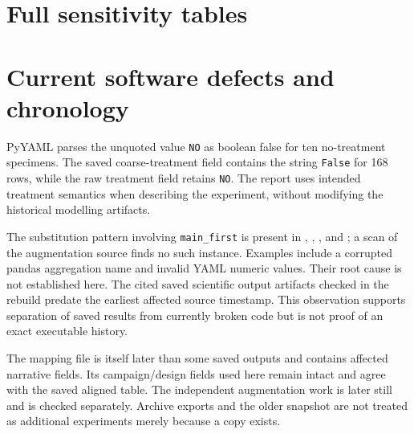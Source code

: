 \section{Full sensitivity tables}
\begin{table}[htbp]\centering\small
\caption{Selected post-onset configurations for 43 terminal specimens over ten grouped folds. MAE and sample SD are in kN; other columns are mean fold metrics. Input/model selection is exploratory and shares the evaluation folds.}\label{tab:postfull}

\end{table}
\begin{table}[htbp]\centering\footnotesize
\caption{All selected within-mesh feature families, with 24 terminal specimens per mesh group and ten grouped folds per analysis. MAE is in kN. Every row has negative mean test $R^2$; Spearman varies and is not uniformly null. Model choices differ by feature family.}\label{tab:meshfull}

\end{table}
\FloatBarrier

\section{Current software defects and chronology}
PyYAML parses the unquoted value \texttt{NO} as boolean false for ten no-treatment specimens. The saved coarse-treatment field contains the string \texttt{False} for 168 rows, while the raw treatment field retains \texttt{NO}. The report uses intended treatment semantics when describing the experiment, without modifying the historical modelling artifacts.

The substitution pattern involving \texttt{main\_first} is present in , , , and ; a scan of the augmentation source finds no such instance. Examples include a corrupted pandas aggregation name and invalid YAML numeric values. Their root cause is not established here. The cited saved scientific output artifacts checked in the rebuild predate the earliest affected source timestamp. This observation supports separation of saved results from currently broken code but is not proof of an exact executable history.

The mapping file is itself later than some saved outputs and contains affected narrative fields. Its campaign/design fields used here remain intact and agree with the saved aligned table. The independent augmentation work is later still and is checked separately. Archive exports and the older snapshot are not treated as additional experiments merely because a copy exists.

